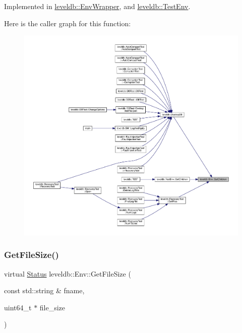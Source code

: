 Implemented in \mbox{\hyperlink{classleveldb_1_1_env_wrapper_a5382cf15ad3a80c23f291238125d752d}{leveldb\+::\+Env\+Wrapper}}, and \mbox{\hyperlink{classleveldb_1_1_test_env_ac0ab9af039ce4ca277c3df2b437821a7}{leveldb\+::\+Test\+Env}}.

Here is the caller graph for this function\+:
\nopagebreak
\begin{figure}[H]
\begin{center}
\leavevmode
\includegraphics[width=350pt]{classleveldb_1_1_env_a53028e3112d7bb3bf6574ddaab18d6f6_icgraph}
\end{center}
\end{figure}
\mbox{\label{classleveldb_1_1_env_aacb66541dcb3bd586e6cc5a87489690c}} 
\subsubsection{\texorpdfstring{GetFileSize()}{GetFileSize()}}
{\footnotesize\ttfamily virtual \mbox{\hyperlink{classleveldb_1_1_status}{Status}} leveldb\+::\+Env\+::\+Get\+File\+Size (\begin{DoxyParamCaption}\item[{const std\+::string \&}]{fname,  }\item[{uint64\+\_\+t $\ast$}]{file\+\_\+size }\end{DoxyParamCaption})\hspace{0.3cm}{\ttfamily [pure virtual]}}



